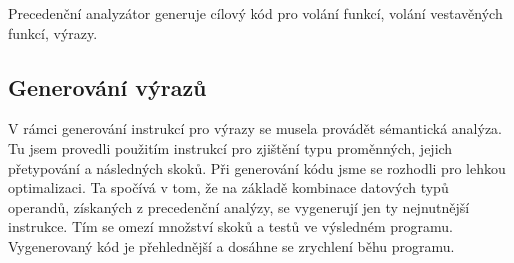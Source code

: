 \documentclass[11pt, a4paper]{article}
\begin{document}
Precedenční analyzátor generuje cílový kód pro volání funkcí, volání vestavěných funkcí, výrazy.  

\subsection{Generování výrazů}
V rámci generování instrukcí pro výrazy se musela provádět sémantická analýza. Tu jsem provedli použitím instrukcí pro zjištění typu proměnných, jejich přetypování a následných skoků. Při generování kódu jsme se rozhodli pro lehkou optimalizaci. Ta spočívá v tom, že na základě kombinace datových typů operandů, získaných z precedenční analýzy, se vygenerují jen ty nejnutnější instrukce. Tím se omezí množství skoků a testů ve výsledném programu. Vygenerovaný kód je přehlednější a dosáhne se zrychlení běhu programu. 

\newpage
\end{document}
